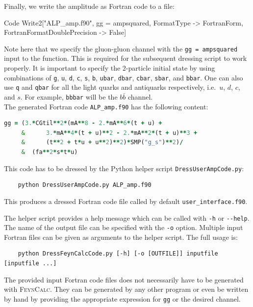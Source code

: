 \documentclass[12pt]{article}
\begin{document}
Finally, we  write the amplitude as Fortran code to a file: 
\begin{mmaCell}{Code}
Write2["ALP_amp.f90", gg = ampsquared, FormatType -> FortranForm, FortranFormatDoublePrecision -> False] 
\end{mmaCell}
Note here that we specify the gluon-gluon channel with the \texttt{gg = ampsquared} input to the function. This is required for the subsequent dressing script to work properly. It is important to specify the $2$-particle initial state by using combinations of \texttt{g}, \texttt{u}, \texttt{d}, \texttt{c}, \texttt{s}, \texttt{b}, \texttt{ubar}, \texttt{dbar}, \texttt{cbar}, \texttt{sbar}, and \texttt{bbar}. One can also use \texttt{q} and \texttt{qbar} for all the light quarks and antiquarks respectively, i.e.\ $u$, $d$, $c$, and $s$. For example, \texttt{bbbar} will be the $b\bar{b}$ channel. \\ 

The generated Fortran code \texttt{ALP\_amp.f90} has the following content:
\begin{lstlisting}[language=Fortran,keywordstyle=\color{Red},stringstyle=\color{Green},identifierstyle=\color{Blue},showstringspaces=false]
        gg = (3.*CGtil**2*(mA**8 - 2.*mA**6*(t + u) + 
     &      3.*mA**4*(t + u)**2 - 2.*mA**2*(t + u)**3 + 
     &      (t**2 + t*u + u**2)**2)*SMP("g_s")**2)/
     &  (fa**2*s*t*u)
\end{lstlisting}
This code has to be dressed by the Python helper script \texttt{DressUserAmpCode.py}: 
\begin{lstlisting}
	python DressUserAmpCode.py ALP_amp.f90 
\end{lstlisting}
This produces a dressed Fortran code file called by default
\texttt{user\_interface.f90}.

The helper script provides a help message which can be called with
\texttt{-h} or \texttt{-{}-help}. The name of the output file can be
specified with the \texttt{-o} option. Multiple input Fortran files
can be given as arguments to the helper script. The full usage is:
\begin{lstlisting}
	python DressFeynCalcCode.py [-h] [-o [OUTFILE]] inputfile [inputfile ...] 
\end{lstlisting}
The provided input Fortran code files does not necessarily have to be
generated with \textsc{FeynCalc}. They can be generated by any other
program or even be written by hand by providing the appropriate
expression for \texttt{gg} or the desired channel.
\end{document}
